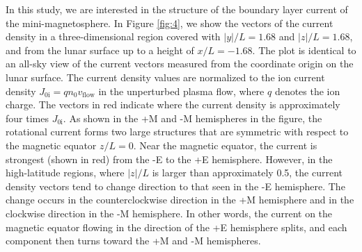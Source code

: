 \documentclass[draft,jgrga]{agutex2015}
\begin{document}
\begin{article}
In this study, 
we are interested in the structure of the boundary layer current  
of the mini-magnetosphere.
In Figure \ref{fig:4}, 
we show the vectors of the current density in a three-dimensional region 
covered with $|y|/L=1.68$ and $|z|/L=1.68$, and 
from the lunar surface up to a height of $x/L = -1.68$.
The plot is identical to an all-sky view of the current vectors
measured from the coordinate origin on the lunar surface. 
The current density values are normalized to 
the ion current density $J_\mathrm{0i}=qn_{0}v_{\mathrm{flow}}$
in the unperturbed plasma flow, where $q$ denotes the ion charge.
The vectors in red indicate where the current density is 
approximately four times $J_\mathrm{0i}$.
As shown in the +M and -M hemispheres in the figure, 
the rotational current forms two large structures that are
symmetric with respect to the magnetic equator $z/L=0$. 
Near the magnetic equator, the current is strongest (shown in red) from the -E to the +E hemisphere.
However, in the high-latitude regions, where $|z|/L$ is larger than approximately 0.5,   
the current density vectors tend to 
change direction to that seen in the -E hemisphere. 
The change occurs in the counterclockwise direction 
in the +M hemisphere and in the clockwise direction in the -M hemisphere.
In other words, the current on the magnetic equator flowing in the direction of 
the +E hemisphere splits, and each component then turns toward
the +M and -M hemispheres.


\end{article}
\end{document}
